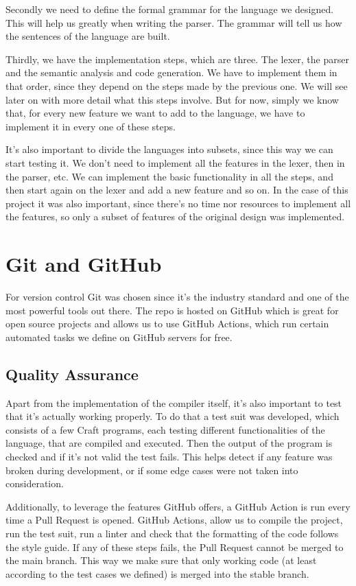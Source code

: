 ﻿\documentclass[10pt,a4paper,twocolumn,twoside]{article}
\begin{document}
Secondly we need to define the formal grammar for the language we designed. This
will help us greatly when writing the parser. The grammar will tell us how the
sentences of the language are built.

Thirdly, we have the implementation steps, which are three. The lexer, the
parser and the semantic analysis and code generation. We have to implement them
in that order, since they depend on the steps made by the previous one.  We will
see later on with more detail what this steps involve. But for now, simply we
know that, for every new feature we want to add to the language, we have to
implement it in every one of these steps.

It's also important to divide the languages into subsets, since this way we 
can start testing it. We don't need to implement all the features in the lexer,
then in the parser, etc. We can implement the basic functionality in all the 
steps, and then start again on the lexer and add a new feature and so on. In the
case of this project it was also important, since there's no time nor resources
to implement all the features, so only a subset of features of the original 
design was implemented.

\section{Git and GitHub}
For version control Git was chosen since it's the industry standard and one of
the most powerful tools out there. The repo is hosted on GitHub which is great
for open source projects and allows us to use GitHub Actions, which run certain
automated tasks we define on GitHub servers for free.

\subsection{Quality Assurance}
Apart from the implementation of the compiler itself, it's also important to 
test that it's actually working properly. To do that a test suit was developed,
which consists of a few Craft programs, each testing different functionalities 
of the language, that are compiled and executed. Then the output of the program 
is checked and if it's not valid the test fails. This helps detect if any 
feature was broken during development, or if some edge cases were not taken into
consideration.

Additionally, to leverage the features GitHub offers, a GitHub Action is run 
every time a Pull Request is opened. GitHub Actions, allow us to compile the 
project, run the test suit, run a linter and check that the formatting of the 
code follows the style guide. If any of these steps fails, the Pull Request
cannot be merged to the main branch. This way we make sure that only working 
code (at least according to the test cases we defined) is merged into the stable 
branch.
\end{document}
